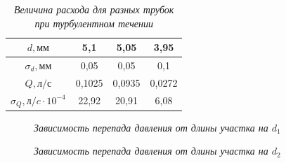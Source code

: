 \documentclass[a4paper, fontsize = 14pt]{article}
\begin{document}
\begin{table}[hbt]
\centering
\caption{\textit{Величина расхода для разных трубок при турбулентном течении}}
\begin{tabular}{|c|c|c|c|}
\hline
\textbf{$d, мм$}                         & 5,1    & 5,05   & 3,95   \\ \hline
\textbf{$\sigma_{d}, мм$}                & 0,05   & 0,05   & 0,1    \\ \hline
\textbf{$Q, л/с$}                        & 0,1025 & 0,0935 & 0,0272 \\ \hline
\textbf{$\sigma_{Q}, л/c \cdot 10^{-4}$} & 22,92  & 20,91  & 6,08   \\ \hline
\end{tabular}
\end{table}


\begin{figure}[hbt]
\caption{\textit{Зависимость перепада давления от длины участка на $d_1$}}
\end{figure}

\begin{figure}[hbt]
\caption{\textit{Зависимость перепада давления от длины участка на $d_2$}}
\end{figure}
\end{document}
